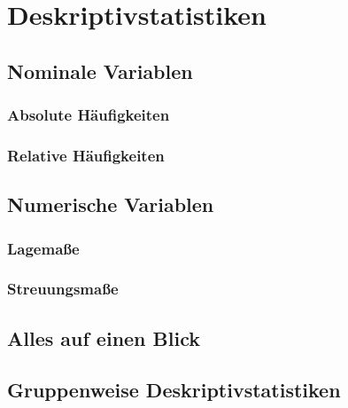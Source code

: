 \documentclass[
]{book}
\begin{document}
\hypertarget{deskriptivstatistiken}{%
\section{Deskriptivstatistiken}\label{deskriptivstatistiken}}

\hypertarget{nominale-variablen}{%
\subsection{Nominale Variablen}\label{nominale-variablen}}

\hypertarget{absolute-huxe4ufigkeiten}{%
\subsubsection{Absolute Häufigkeiten}\label{absolute-huxe4ufigkeiten}}

\hypertarget{relative-huxe4ufigkeiten}{%
\subsubsection{Relative Häufigkeiten}\label{relative-huxe4ufigkeiten}}

\hypertarget{numerische-variablen}{%
\subsection{Numerische Variablen}\label{numerische-variablen}}

\hypertarget{lagemauxdfe}{%
\subsubsection{Lagemaße}\label{lagemauxdfe}}

\hypertarget{streuungsmauxdfe}{%
\subsubsection{Streuungsmaße}\label{streuungsmauxdfe}}

\hypertarget{alles-auf-einen-blick}{%
\subsection{Alles auf einen Blick}\label{alles-auf-einen-blick}}

\hypertarget{gruppenweise-deskriptivstatistiken}{%
\subsection{Gruppenweise Deskriptivstatistiken}\label{gruppenweise-deskriptivstatistiken}}
\end{document}
